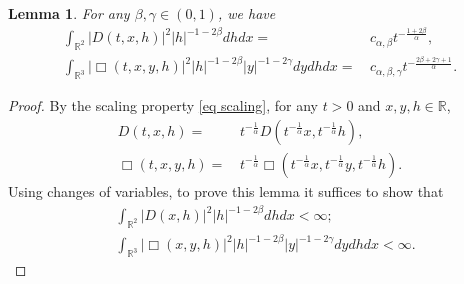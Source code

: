 \documentclass[11pt,reqno]{amsart}
\numberwithin{equation}{section}
\newtheorem{lemma}{Lemma}[section]
\newcommand{\1}{{\bf 1}}
\newcommand{\2}{{\bf 2}}
\begin{document}
\begin{lemma}\label{lem 2.8}
For any $\beta,\gamma\in (0,1)$, we have
\begin{align} 
\int_{\mathbb{R}^2}|D(t,x,h)|^2|h|^{-1-2\beta}dhdx=&\,  c_{\alpha,\beta} t^{-\frac{1+2\beta}{\alpha}}, \label{eq  2.17}\\
  \int_{\mathbb{R}^3}|\Box(t,x,y,h)|^2|h|^{-1-2\beta}|y|^{-1-2\gamma}dydhdx=&\, c_{\alpha,\beta,\gamma}t^{-\frac{2\beta+2\gamma+1}{\alpha}}. \label{eq 2.18}
\end{align}
\end{lemma}
\begin{proof} 
By the scaling property  \eqref{eq scaling},   for any $t>0$ and $x, y, h\in\mathbb{R}$,
\begin{equation}\label{eq scaling 2}
\begin{split}
D(t,x,h)=&\, t^{-\frac{1}{\alpha}}D\left(t^{-\frac{1}{\alpha}}x,t^{-\frac{1}{\alpha}}h\right),\\
 \Box(t,x,y,h)=&\, t^{-\frac{1}{\alpha}}\Box\left(t^{-\frac{1}{\alpha}}x,t^{-\frac{1}{\alpha}}y,t^{-\frac{1}{\alpha}}h\right).
 \end{split}
\end{equation}
Using changes of variables,   to prove this lemma  it suffices to show that 
\begin{equation}\label{eq iden 1}
\begin{split}
&\int_{\mathbb{R}^2}|D(x,h)|^2|h|^{-1-2\beta}dhdx<\infty;\\
&\int_{\mathbb{R}^3}|\Box(x,y,h)|^2|h|^{-1-2\beta}|y|^{-1-2\gamma}dydhdx<\infty.
\end{split}
\end{equation}


\end{proof}
\end{document}
